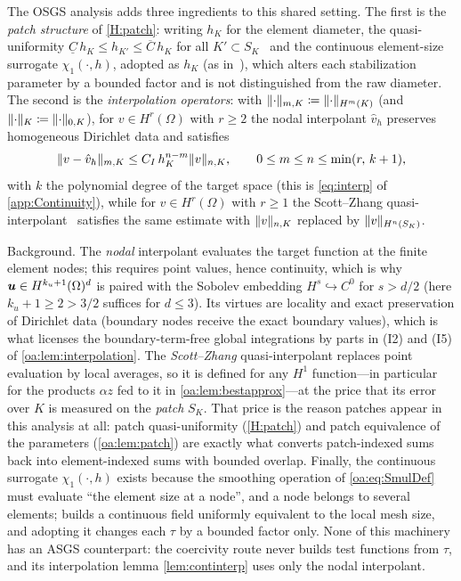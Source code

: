 The OSGS analysis adds three ingredients to this shared setting. The first is the \emph{patch
structure} of \cref{H:patch}: writing $h_K$ for the element diameter, the quasi{\hyp}uniformity
$\underline{C}\, h_{K} \le h_{K'} \le \overline{C}\, h_K$ for all $K' \subset S_K$~\cite{AinsworthOden}
and the continuous element{\hyp}size surrogate $\chi_1(\cdot, h)$, adopted as $h_K$ (as
in~\cite[Lemma~1]{codina2008analysis}), which alters each stabilization parameter by a bounded factor
and is not distinguished from the raw diameter. The second is the \emph{interpolation operators}: with
$\lVert \cdot \rVert_{m,K} \coloneqq \lVert \cdot \rVert_{H^m(K)}$ (and $\lVert \cdot \rVert_{K} \coloneqq \lVert \cdot \rVert_{0,K}$), for
$v \in H^{r}(\Omega)$ with $r \ge 2$ the nodal interpolant $\hat v_h$ preserves homogeneous Dirichlet
data and satisfies
\begin{equation}
  \label{oa:eq:NodalInterp}
  \lVert v - \hat v_h \rVert_{m,K} \le C_I\, h_K^{n-m}\lVert v \rVert_{n,K},
  \qquad 0 \le m \le n \le \min(r,\, k+1),
\end{equation}
with $k$ the polynomial degree of the target space (this is \cref{eq:interp} of \cref{app:Continuity}),
while for $v \in H^{r}(\Omega)$ with $r \ge 1$ the Scott--Zhang quasi{\hyp}interpolant~\cite{ScottZhang}
satisfies the same estimate with $\lVert v \rVert_{n,K}$ replaced by $\lVert v \rVert_{H^n(S_K)}$.

\begin{pedagogy}
Background. The \emph{nodal} interpolant evaluates the target function at the
finite element nodes; this requires point values, hence continuity, which is why
$\boldsymbol{u} \in H^{k_u+1}(\Omega)^d$ is paired with the Sobolev embedding
$H^{s} \hookrightarrow C^0$ for $s > d/2$ (here $k_u+1 \ge 2 > 3/2$ suffices for
$d \le 3$). Its virtues are locality and exact preservation of Dirichlet data
(boundary nodes receive the exact boundary values), which is what licenses the
boundary-term-free global integrations by parts in (I2) and (I5) of
\cref{oa:lem:interpolation}. The \emph{Scott--Zhang} quasi-interpolant replaces
point evaluation by local averages, so it is defined for any $H^1$ function---in
particular for the products $\alpha z$ fed to it in \cref{oa:lem:bestapprox}---at
the price that its error over $K$ is measured on the \emph{patch} $S_K$. That
price is the reason patches appear in this analysis at all: patch
quasi-uniformity (\cref{H:patch}) and patch equivalence of the parameters
(\cref{oa:lem:patch}) are exactly what converts patch-indexed sums back into
element-indexed sums with bounded overlap. Finally, the continuous surrogate
$\chi_1(\cdot,h)$ exists because the smoothing operation of \cref{oa:eq:SmulDef}
must evaluate ``the element size at a node'', and a node belongs to several
elements; \cite[Lemma~1]{codina2008analysis} builds a continuous field uniformly
equivalent to the local mesh size, and adopting it changes each $\tau$ by a
bounded factor only. None of this machinery has an ASGS counterpart: the
coercivity route never builds test functions from $\tau$, and its interpolation
lemma \cref{lem:continterp} uses only the nodal interpolant.
\end{pedagogy}

